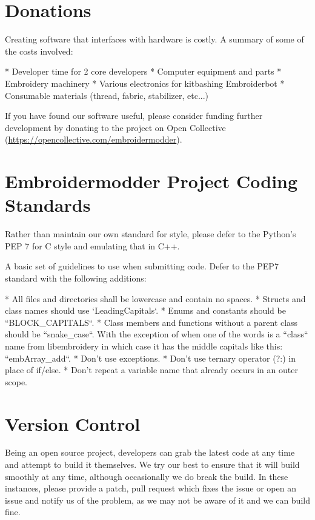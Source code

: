 \documentclass[a4paper]{report}
\begin{document}
\section{Donations}

Creating software that interfaces with hardware is costly. A summary of some of the costs involved:

* Developer time for 2 core developers
* Computer equipment and parts
* Embroidery machinery
* Various electronics for kitbashing Embroiderbot
* Consumable materials (thread, fabric, stabilizer, etc...)

If you have found our software useful, please consider funding further development by donating to the project on Open Collective
(\url{https://opencollective.com/embroidermodder}).

\section{Embroidermodder Project Coding Standards}

Rather than maintain our own standard for style, please defer to
the Python's PEP 7 %
for C style and emulating that in C++.

A basic set of guidelines to use when submitting code. Defer to the PEP7 standard with the following additions:

* All files and directories shall be lowercase and contain no spaces.
* Structs and class names should use `LeadingCapitals`.
* Enums and constants should be ``BLOCK\_CAPITALS``.
* Class members and functions without a parent class should be ``snake\_case``.
  With the exception of when one of the words is a ``class`` name from
  libembroidery in which case it has the middle capitals like this:
  ``embArray\_add``.
* Don't use exceptions.
* Don't use ternary operator (?:) in place of if/else.
* Don't repeat a variable name that already occurs in an outer scope.

\section{Version Control}

Being an open source project, developers can grab the latest code at any
time and attempt to build it themselves. We try our best to ensure that
it will build smoothly at any time, although occasionally we do break
the build. In these instances, please provide a patch, pull request
which fixes the issue or open an issue and notify us of the problem, as
we may not be aware of it and we can build fine.
\end{document}
